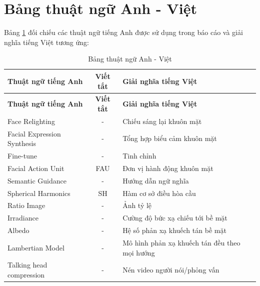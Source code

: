 \section*{Bảng thuật ngữ Anh - Việt}

Bảng \ref{tab:glossary} đối chiếu các thuật ngữ tiếng Anh được sử dụng trong báo cáo và giải nghĩa tiếng Việt tương ứng:

\begin{longtable}{p{5.2cm}cp{8.2cm}}
    \caption{Bảng thuật ngữ Anh - Việt} \label{tab:glossary}                                              \\
    \toprule
    \textbf{Thuật ngữ tiếng Anh}      & \textbf{Viết tắt} & \textbf{Giải nghĩa tiếng Việt}                \\ \midrule
    \endfirsthead
    \toprule
    \textbf{Thuật ngữ tiếng Anh}      & \textbf{Viết tắt} & \textbf{Giải nghĩa tiếng Việt}                \\ \midrule
    \endhead
    \bottomrule
    \endfoot
    Face Relighting                   & -                 & Chiếu sáng lại khuôn mặt                      \\
    Facial Expression Synthesis       & -                 & Tổng hợp biểu cảm khuôn mặt                   \\
    Fine-tune                         & -                 & Tinh chỉnh                                    \\
    Facial Action Unit                & FAU               & Đơn vị hành động khuôn mặt                    \\
    Semantic Guidance                 & -                 & Hướng dẫn ngữ nghĩa                           \\
    Spherical Harmonics               & SH                & Hàm cơ sở điều hòa cầu                        \\
    Ratio Image                       & -                 & Ảnh tỷ lệ                                     \\
    Irradiance                        & -                 & Cường độ bức xạ chiếu tới bề mặt              \\
    Albedo                            & -                 & Hệ số phản xạ khuếch tán bề mặt               \\
    Lambertian Model                  & -                 & Mô hình phản xạ khuếch tán đều theo mọi hướng \\
    Talking head compression          & -                 & Nén video người nói/phỏng vấn                 \\

\end{longtable}

